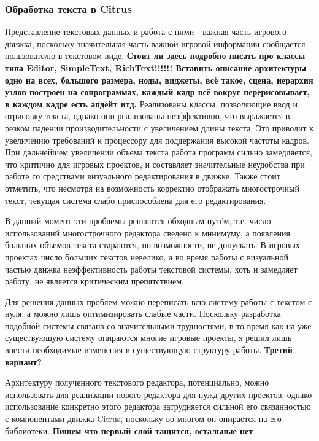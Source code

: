 \documentclass{fefu}
\begin{document}
			\subsubsection{Обработка текста в Citrus}
				\par Представление текстовых данных и работа с ними - важная часть игрового
				движка, поскольку значительная часть важной игровой информации сообщается 
				пользователю в текстовом виде. \textbf{Стоит ли здесь подробно писать про
				классы типа Editor, SimpleText, RichText!!!!!! Вставить описание архитектуры
				одно на всех, большого размера, ноды, виджеты, всё такое, сцена, иерархия узлов
				построен на сопрограммах, каждый кадр всё вокруг перерисовывает, в каждом кадре
				есть апдейт итд.
				} Реализованы 
				классы, позволяющие ввод и отрисовку текста, однако они реализованы
				неэффективно, что выражается в резком падении производительности с увеличением
				длины текста. Это приводит к увеличению
				требований к процессору для поддержания высокой частоты кадров. При дальнейшем
				увеличении объема текста работа программ сильно замедляется, что критично для
				игровых проектов, и составляет значительные неудобства при работе со средствами
				визуального редактирования в движке. Также стоит отметить, что несмотря на
				возможность корректно отображать многострочный текст, текущая система слабо
				приспособлена для его редактирования.
				\par В данный момент эти проблемы решаются обходным путём, т.е. число
				использований многострочного редактора сведено к минимуму, а появления больших
				объемов текста стараются, по возможности, не допускать. В игровых проектах
				число больших текстов невелико, а во время работы с визуальной частью движка
				неэффективность работы текстовой системы, хоть и замедляет работу, не является
				критическим препятствием.
				\par Для решения данных проблем можно переписать всю систему работы с текстом с
				нуля, а можно лишь оптимизировать слабые части. Поскольку разработка подобной
				системы связана со значительными трудностями, в то время как на уже
				существующую систему опираются многие игровые проекты, я решил лишь внести 
				необходимые изменения в существующую структуру работы. \textbf{Третий вариант?}
				\par Архитектуру полученного текстового редактора, потенциально, можно
				использовать для реализации нового редактора для нужд других проектов, однако
				использование конкретно этого редактора затрудняется сильной его связанностью
				с компонентами движка Citrus, поскольку во многом он опирается на его
				библиотеки.	\textbf{Пишем что первый слой тащится, остальные нет}
\end{document}
